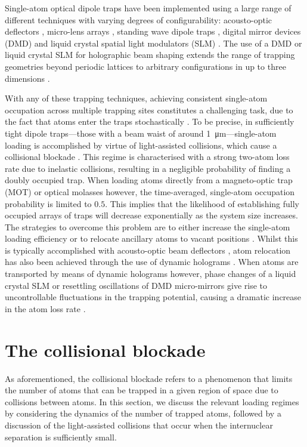 \documentclass[../Thesis-IJspeert.tex]{subfiles}
\begin{document}
Single-atom optical dipole traps have been implemented using a large range of different techniques with varying degrees of configurability: acousto-optic deflectors \cite{Endres2016, Bernien2017}, micro-lens arrays \cite{OhldeMello2019}, standing wave dipole traps \cite{Alt2003, Gallego2018}, digital mirror devices (DMD) \cite{Stuart2018} and liquid crystal spatial light modulators (SLM) \cite{Bergamini2004, Kim2016}. The use of a DMD or liquid crystal SLM for holographic beam shaping extends the range of trapping geometries beyond periodic lattices to arbitrary configurations in up to three dimensions \cite{Barredo2018}.

With any of these trapping techniques, achieving consistent single-atom occupation across multiple trapping sites constitutes a challenging task, due to the fact that atoms enter the traps stochastically \cite{Grimm2000}. To be precise, in sufficiently tight dipole traps---those with a beam waist of around \SI{1}{\micro\meter}---single-atom loading is accomplished by virtue of light-assisted collisions, which cause a collisional blockade \cite{Schlosser2002}. This regime is characterised with a strong two-atom loss rate due to inelastic collisions, resulting in a negligible probability of finding a doubly occupied trap. When loading atoms directly from a magneto-optic trap (MOT) or optical molasses however, the time-averaged, single-atom occupation probability is limited to $0.5$. This implies that the likelihood of establishing fully occupied arrays of traps will decrease exponentially as the system size increases. The strategies to overcome this problem are to either increase the single-atom loading efficiency \cite{Fung2014} or to relocate ancillary atoms to vacant positions \cite{Vala2005}. Whilst this is typically accomplished with acousto-optic beam deflectors \cite{Barredo2018}, atom relocation has also been achieved through the use of dynamic holograms \cite{Kim2016,Kim2019}. When atoms are transported by means of dynamic holograms however, phase changes of a liquid crystal SLM or resettling oscillations of DMD micro-mirrors give rise to uncontrollable fluctuations in the trapping potential, causing a dramatic increase in the atom loss rate \cite{Stuart2018,McGloin2003}.

\section{The collisional blockade}
As aforementioned, the collisional blockade refers to a phenomenon that limits the number of atoms that can be trapped in a given region of space due to collisions between atoms. In this section, we discuss the relevant loading regimes by considering the dynamics of the number of trapped atoms, followed by a discussion of the light-assisted collisions that occur when the internuclear separation is sufficiently small.
\end{document}
